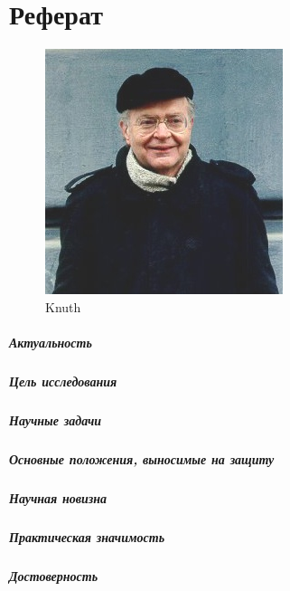 \chapter*{Реферат}


\begin{figure}
    \centering
    \includegraphics[width=0.6\linewidth]{images/knuth}
    \caption{Knuth}
    \label{fig:my_label2}
\end{figure}

\paragraph*{Актуальность}

\paragraph*{Цель исследования}
\paragraph*{Научные задачи}
\paragraph*{Основные положения, выносимые на защиту}
\paragraph*{Научная новизна}
\paragraph*{Практическая значимость}
\paragraph*{Достоверность}
